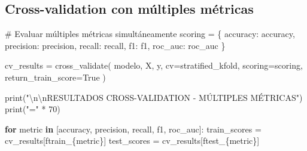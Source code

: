 \documentclass[
  doc,
  floatsintext,
  longtable,
  a4paper,
  nolmodern,
  notxfonts,
  notimes,
  12pt,
  colorlinks=true,linkcolor=blue,citecolor=blue,urlcolor=blue]{apa7}
\newenvironment{Shaded}{\begin{snugshade}}{\end{snugshade}}
\newcommand{\BuiltInTok}[1]{\textcolor[rgb]{0.00,0.23,0.31}{#1}}
\newcommand{\CharTok}[1]{\textcolor[rgb]{0.13,0.47,0.30}{#1}}
\newcommand{\CommentTok}[1]{\textcolor[rgb]{0.37,0.37,0.37}{#1}}
\newcommand{\ControlFlowTok}[1]{\textcolor[rgb]{0.00,0.23,0.31}{\textbf{#1}}}
\newcommand{\DecValTok}[1]{\textcolor[rgb]{0.68,0.00,0.00}{#1}}
\newcommand{\KeywordTok}[1]{\textcolor[rgb]{0.00,0.23,0.31}{\textbf{#1}}}
\newcommand{\NormalTok}[1]{\textcolor[rgb]{0.00,0.23,0.31}{#1}}
\newcommand{\OperatorTok}[1]{\textcolor[rgb]{0.37,0.37,0.37}{#1}}
\newcommand{\SpecialCharTok}[1]{\textcolor[rgb]{0.37,0.37,0.37}{#1}}
\newcommand{\SpecialStringTok}[1]{\textcolor[rgb]{0.13,0.47,0.30}{#1}}
\newcommand{\StringTok}[1]{\textcolor[rgb]{0.13,0.47,0.30}{#1}}
\newcommand{\VariableTok}[1]{\textcolor[rgb]{0.07,0.07,0.07}{#1}}
\begin{document}
\subsection{Cross-validation con múltiples
métricas}\label{cross-validation-con-muxfaltiples-muxe9tricas}

\begin{Shaded}
\begin{Highlighting}[]
\CommentTok{\# Evaluar múltiples métricas simultáneamente}
\NormalTok{scoring }\OperatorTok{=}\NormalTok{ \{}
    \StringTok{\textquotesingle{}accuracy\textquotesingle{}}\NormalTok{: }\StringTok{\textquotesingle{}accuracy\textquotesingle{}}\NormalTok{,}
    \StringTok{\textquotesingle{}precision\textquotesingle{}}\NormalTok{: }\StringTok{\textquotesingle{}precision\textquotesingle{}}\NormalTok{,}
    \StringTok{\textquotesingle{}recall\textquotesingle{}}\NormalTok{: }\StringTok{\textquotesingle{}recall\textquotesingle{}}\NormalTok{,}
    \StringTok{\textquotesingle{}f1\textquotesingle{}}\NormalTok{: }\StringTok{\textquotesingle{}f1\textquotesingle{}}\NormalTok{,}
    \StringTok{\textquotesingle{}roc\_auc\textquotesingle{}}\NormalTok{: }\StringTok{\textquotesingle{}roc\_auc\textquotesingle{}}
\NormalTok{\}}

\NormalTok{cv\_results }\OperatorTok{=}\NormalTok{ cross\_validate(}
\NormalTok{    modelo, X, y,}
\NormalTok{    cv}\OperatorTok{=}\NormalTok{stratified\_kfold,}
\NormalTok{    scoring}\OperatorTok{=}\NormalTok{scoring,}
\NormalTok{    return\_train\_score}\OperatorTok{=}\VariableTok{True}
\NormalTok{)}

\BuiltInTok{print}\NormalTok{(}\StringTok{"}\CharTok{\textbackslash{}n\textbackslash{}n}\StringTok{RESULTADOS CROSS{-}VALIDATION {-} MÚLTIPLES MÉTRICAS"}\NormalTok{)}
\BuiltInTok{print}\NormalTok{(}\StringTok{"="} \OperatorTok{*} \DecValTok{70}\NormalTok{)}

\ControlFlowTok{for}\NormalTok{ metric }\KeywordTok{in}\NormalTok{ [}\StringTok{\textquotesingle{}accuracy\textquotesingle{}}\NormalTok{, }\StringTok{\textquotesingle{}precision\textquotesingle{}}\NormalTok{, }\StringTok{\textquotesingle{}recall\textquotesingle{}}\NormalTok{, }\StringTok{\textquotesingle{}f1\textquotesingle{}}\NormalTok{, }\StringTok{\textquotesingle{}roc\_auc\textquotesingle{}}\NormalTok{]:}
\NormalTok{    train\_scores }\OperatorTok{=}\NormalTok{ cv\_results[}\SpecialStringTok{f\textquotesingle{}train\_}\SpecialCharTok{\{}\NormalTok{metric}\SpecialCharTok{\}}\SpecialStringTok{\textquotesingle{}}\NormalTok{]}
\NormalTok{    test\_scores }\OperatorTok{=}\NormalTok{ cv\_results[}\SpecialStringTok{f\textquotesingle{}test\_}\SpecialCharTok{\{}\NormalTok{metric}\SpecialCharTok{\}}\SpecialStringTok{\textquotesingle{}}\NormalTok{]}
    

\end{Highlighting}
\end{Shaded}
\end{document}
